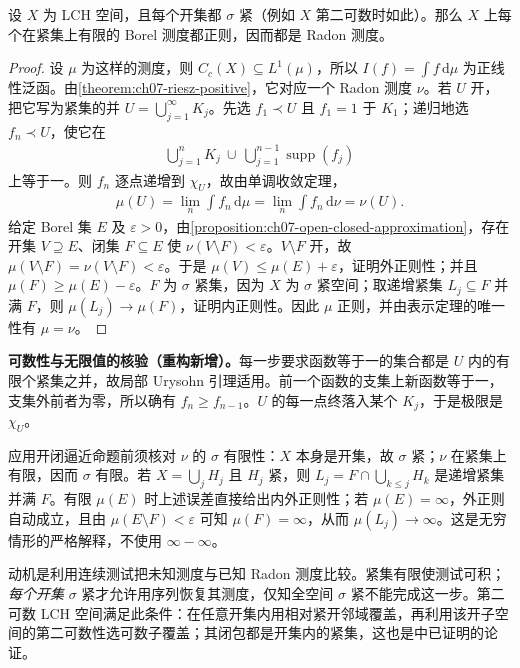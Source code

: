 \documentclass[../../main.tex]{subfiles}
\begin{document}
\begin{theorem}\label{theorem:ch07-automatic-regularity}
设 $X$ 为 LCH 空间，且每个开集都 $\sigma$ 紧（例如 $X$ 第二可数时如此）。那么 $X$ 上每个在紧集上有限的 Borel 测度都正则，因而都是 Radon 测度。
\end{theorem}
\begin{proof}
设 $\mu$ 为这样的测度，则 $C_c(X)\subseteq L^1(\mu)$，所以 $I(f)=\int f\,\mathrm d\mu$ 为正线性泛函。由\cref{theorem:ch07-riesz-positive}，它对应一个 Radon 测度 $\nu$。若 $U$ 开，把它写为紧集的并 $U=\bigcup_{j=1}^\infty K_j$。先选 $f_1\prec U$ 且 $f_1=1$ 于 $K_1$；递归地选 $f_n\prec U$，使它在
\begin{align*}
\bigcup_{j=1}^nK_j\ \cup\ \bigcup_{j=1}^{n-1}\operatorname{supp}(f_j)
\end{align*}
上等于一。则 $f_n$ 逐点递增到 $\chi_U$，故由单调收敛定理，
\begin{align*}
\mu(U)=\lim_n\int f_n\,\mathrm d\mu
=\lim_n\int f_n\,\mathrm d\nu=\nu(U).
\end{align*}
给定 Borel 集 $E$ 及 $\varepsilon>0$，由\cref{proposition:ch07-open-closed-approximation}，存在开集 $V\supseteq E$、闭集 $F\subseteq E$ 使 $\nu(V\setminus F)<\varepsilon$。$V\setminus F$ 开，故 $\mu(V\setminus F)=\nu(V\setminus F)<\varepsilon$。于是 $\mu(V)\leqslant\mu(E)+\varepsilon$，证明外正则性；并且 $\mu(F)\geqslant\mu(E)-\varepsilon$。$F$ 为 $\sigma$ 紧集，因为 $X$ 为 $\sigma$ 紧空间；取递增紧集 $L_j\subseteq F$ 并满 $F$，则 $\mu(L_j)\to\mu(F)$，证明内正则性。因此 $\mu$ 正则，并由表示定理的唯一性有 $\mu=\nu$。
\end{proof}
\begin{remark}
\textbf{可数性与无限值的核验（重构新增）。}每一步要求函数等于一的集合都是 $U$ 内的有限个紧集之并，故局部 Urysohn 引理适用。前一个函数的支集上新函数等于一，支集外前者为零，所以确有 $f_n\geqslant f_{n-1}$。$U$ 的每一点终落入某个 $K_j$，于是极限是 $\chi_U$。

应用开闭逼近命题前须核对 $\nu$ 的 $\sigma$ 有限性：$X$ 本身是开集，故 $\sigma$ 紧；$\nu$ 在紧集上有限，因而 $\sigma$ 有限。若 $X=\bigcup_j H_j$ 且 $H_j$ 紧，则 $L_j=F\cap\bigcup_{k\leqslant j}H_k$ 是递增紧集并满 $F$。有限 $\mu(E)$ 时上述误差直接给出内外正则性；若 $\mu(E)=\infty$，外正则自动成立，且由 $\mu(E\setminus F)<\varepsilon$ 可知 $\mu(F)=\infty$，从而 $\mu(L_j)\to\infty$。这是无穷情形的严格解释，不使用 $\infty-\infty$。

动机是利用连续测试把未知测度与已知 Radon 测度比较。紧集有限使测试可积；\emph{每个开集} $\sigma$ 紧才允许用序列恢复其测度，仅知全空间 $\sigma$ 紧不能完成这一步。第二可数 LCH 空间满足此条件：在任意开集内用相对紧开邻域覆盖，再利用该开子空间的第二可数性选可数子覆盖；其闭包都是开集内的紧集，这也是中已证明的论证。
\end{remark}
\end{document}
